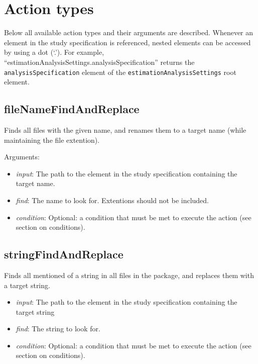 \documentclass[]{article}
\providecommand{\tightlist}{%
  \setlength{\itemsep}{0pt}\setlength{\parskip}{0pt}}
\begin{document}
\hypertarget{action-types}{%
\section{Action types}\label{action-types}}

Below all available action types and their arguments are described.
Whenever an element in the study specification is referenced, nested
elements can be accessed by using a dot (`.'). For example,
``estimationAnalysisSettings.analysisSpecification'' returns the
\texttt{analysisSpecification} element of the
\texttt{estimationAnalysisSettings} root element.

\hypertarget{filenamefindandreplace}{%
\subsection{fileNameFindAndReplace}\label{filenamefindandreplace}}

Finds all files with the given name, and renames them to a target name
(while maintaining the file extention).

Arguments:

\begin{itemize}
\tightlist
\item
  \emph{input}: The path to the element in the study specification
  containing the target name.
\item
  \emph{find}: The name to look for. Extentions should not be included.
\item
  \emph{condition}: Optional: a condition that must be met to execute
  the action (see section on conditions).
\end{itemize}

\hypertarget{stringfindandreplace}{%
\subsection{stringFindAndReplace}\label{stringfindandreplace}}

Finds all mentioned of a string in all files in the package, and
replaces them with a target string.

\begin{itemize}
\tightlist
\item
  \emph{input}: The path to the element in the study specification
  containing the target string
\item
  \emph{find}: The string to look for.
\item
  \emph{condition}: Optional: a condition that must be met to execute
  the action (see section on conditions).
\end{itemize}
\end{document}
